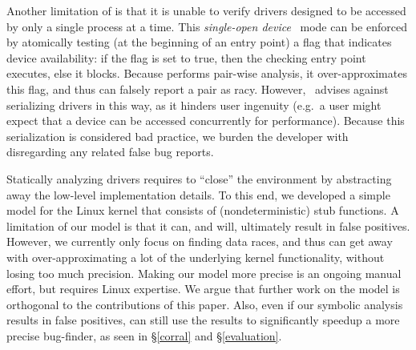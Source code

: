 Another limitation of \whoop is that it is unable to verify drivers designed to be accessed by only a single process at a time. This \emph{single-open device}~\cite{corbet2005linux} mode can be enforced by atomically testing (at the beginning of an entry point) a flag that indicates device availability: if the flag is set to true, then the checking entry point executes, else it blocks. Because \whoop performs pair-wise analysis, it over-approximates this flag, and thus can falsely report a pair as racy. However,~\cite{corbet2005linux} advises against serializing drivers in this way, as it hinders user ingenuity (e.g.\ a user might expect that a device can be accessed concurrently for performance). Because this serialization is considered bad practice, we burden the developer with disregarding any related false bug reports.

Statically analyzing drivers requires to ``close'' the environment by abstracting away the low-level implementation details. To this end, we developed a simple model for the Linux kernel that consists of (nondeterministic) stub functions. A limitation of our model is that it can, and will, ultimately result in false positives. However, we currently only focus on finding data races, and thus can get away with over-approximating a lot of the underlying kernel functionality, without losing too much precision. Making our model more precise is an ongoing manual effort, but requires Linux expertise. We argue that further work on the model is orthogonal to the contributions of this paper. Also, even if our symbolic analysis results in false positives, \whoop can still use the results to significantly speedup a more precise bug-finder, as seen in \S\ref{corral} and \S\ref{evaluation}.
